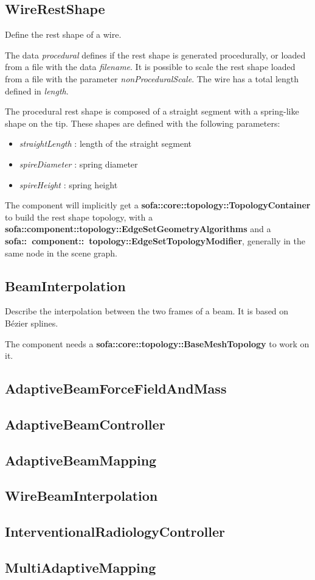 \documentclass[a4paper,10pt]{article}
\begin{document}
\subsection{WireRestShape}

Define the rest shape of a wire.

The data \textit{procedural} defines if the rest shape is generated procedurally, or loaded from a file with the data \textit{filename}. 
It is possible to scale the rest shape loaded from a file with the parameter \textit{nonProceduralScale}.
The wire has a total length defined in \textit{length}.

The procedural rest shape is composed of a straight segment with a spring-like shape on the tip.
These shapes are defined with the following parameters:
\begin{itemize}
  \item \textit{straightLength} : length of the straight segment
  \item \textit{spireDiameter} : spring diameter
  \item \textit{spireHeight} : spring height
\end{itemize}


The component will implicitly get a \textbf{sofa::core::topology::TopologyContainer} to build the rest shape topology, with a \textbf{sofa::component::topology::EdgeSetGeometryAlgorithms} and a \textbf{sofa::~component::~topology::EdgeSetTopologyModifier}, generally in the same node in the scene graph.

\subsection{BeamInterpolation }

Describe the interpolation between the two frames of a beam. It is based on B\'ezier splines.

The component needs a \textbf{sofa::core::topology::BaseMeshTopology} to work on it.

\subsection{AdaptiveBeamForceFieldAndMass }
\subsection{AdaptiveBeamController }
\subsection{AdaptiveBeamMapping }
\subsection{WireBeamInterpolation }
\subsection{InterventionalRadiologyController }
\subsection{MultiAdaptiveMapping }




\end{document}
